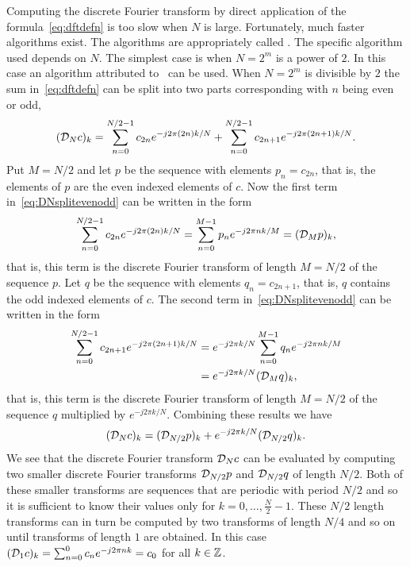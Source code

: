 Computing the discrete Fourier transform by direct application of the formula~\eqref{eq:dftdefn} is too slow when $N$ is large.  Fortunately, much faster algorithms exist.  The algorithms are appropriately called .  The specific algorithm used depends on $N$.  The simplest case is when $N = 2^m$ is a power of $2$.  In this case an algorithm attributed to~\citet{Cooley_tukey_1965} can be used.  %
When $N = 2^m$ is divisible by $2$ the sum in~\eqref{eq:dftdefn} can be split into two parts corresponding with $n$ being even or odd,
\begin{equation}\label{eq:DNsplitevenodd}
({\mathcal D}_N c)_k =  \sum_{n = 0}^{N/2-1} c_{2n} e^{-j 2\pi (2n)k/N} +  \sum_{n = 0}^{N/2-1} c_{2n+1} e^{-j 2\pi (2n+1) k/N}.
\end{equation}
Put $M = N/2$ and let $p$ be the sequence with elements $p_n = c_{2n}$, that is, the elements of $p$ are the even indexed elements of $c$.  Now the first term in~\eqref{eq:DNsplitevenodd} can be written in the form
\[
\sum_{n = 0}^{N/2-1} c_{2n} e^{-j 2\pi (2n)k/N}  = \sum_{n = 0}^{M-1} p_n e^{-j 2\pi n k/M} = ({\mathcal D}_M p)_k,
\]
that is, this term is the discrete Fourier transform of length $M = N/2$ of the sequence $p$.  Let $q$ be the sequence with elements $q_n = c_{2n+1}$, that is, $q$ contains the odd indexed elements of $c$.  The second term in~\eqref{eq:DNsplitevenodd} can be written in the form
\begin{align*}
\sum_{n = 0}^{N/2-1} c_{2n+1} e^{-j 2\pi (2n+1) k/N} &= e^{-j 2\pi k / N} \sum_{n = 0}^{M-1} q_n e^{-j 2\pi n k/M} \\
&= e^{-j 2\pi k / N} ({\mathcal D}_{M}q)_k,
\end{align*}
that is, this term is the discrete Fourier transform of length $M=N/2$ of the sequence $q$ multiplied by $e^{-j 2\pi k / N}$.  Combining these results we have
\[
({\mathcal D}_N c)_k = ({\mathcal D}_{N/2}p)_k + e^{-j 2\pi k / N} ({\mathcal D}_{N/2} q)_k.
\]
We see that the discrete Fourier transform ${\mathcal D}_N c$ can be evaluated by computing two smaller discrete Fourier transforms ${\mathcal D}_{N/2} p$ and ${\mathcal D}_{N/2} q$ of length $N/2$.  Both of these smaller transforms are sequences that are periodic with period $N/2$ and so it is sufficient to know their values only for $k = 0,\dots,\tfrac{N}{2}-1$.  %
These $N/2$ length transforms can in turn be computed by two transforms of length $N/4$ and so on until transforms of length $1$ are obtained.  In this case $({\mathcal D}_{1} c)_k = \sum_{n = 0}^{0} c_n e^{-j 2\pi n k } = c_0$  for all $k \in {\mathbb Z}$.  

